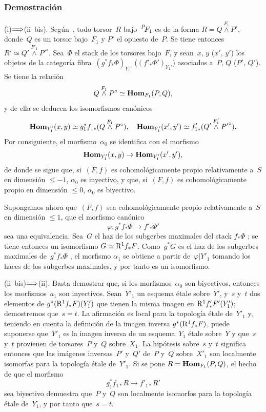 \subsubsection*{Demostración}
(i)$\Longrightarrow$(ii~bis). Según~\cite[II 4.2.5]{XIII.1}, todo torsor~$R$
bajo~$\leftexp{P\mkern-4mu}{F}_1$ es de la forma $R = Q
\overset{F_1}{\wedge} P^\circ$, donde~$Q$ es un torsor bajo~$F_1$ y
$P^\circ$ el opuesto de~$P$. Se tiene entonces $R' \simeq Q'
\overset{F'_1}{\wedge} {P'}^\circ$. Sea~$\Phi$ el stack de los torsores
bajo~$F$, y sean~$x$, $y$ (\resp $x'$, $y'$) los objetos de la categoría
fibra~$(g^* f_* \Phi)_{Y_1'}$ (\resp $(f'_*
\Phi')_{Y_1'}$) asociados a~$P$, $Q$ (\resp $P'$, $Q'$). Se tiene la
relación
$$
Q\overset{F_1}{\wedge} P^\circ \simeq \operatorname{\mathbf{Hom}}_{F_1}(P,Q) \text{,}
$$
y de ella se deducen los isomorfismos canónicos
$$
\operatorname{\mathbf{Hom}}_{Y'_1}(x,y) \simeq g_1^* f_{1 *}(Q
\overset{F_1}{\wedge} P^\circ) \text{,}\quad \operatorname{\mathbf{Hom}}_{Y_1'}(x',y')
\simeq f'_{1 *}(Q' \overset{F'_1}{\wedge}{P'}^\circ)\text{.}
$$
Por consiguiente, el morfismo~$\alpha_0$ se identifica con el morfismo
$$
\operatorname{\mathbf{Hom}}_{Y'_1}(x,y) \to \operatorname{\mathbf{Hom}}_{Y'_1}(x',y') \text{,}
$$
de donde se sigue que, si~$(F,f)$ es cohomológicamente propio
relativamente a~$S$ en dimensión $\leqslant -1$, $\alpha_0$ es inyectivo,
y que, si~$(F,f)$ es cohomológicamente propio en dimensión $\leqslant 0$,
$\alpha_0$ es biyectivo.

Supongamos ahora que~$(F,f)$ sea cohomológicamente propio relativamente
a~$S$ en dimensión $\leqslant 1$, \ie que el morfismo canónico
$$
\varphi \colon g^* f_* \Phi \to f'_* \Phi'
$$
sea una equivalencia. Sea~$G$ el haz de los subgerbes maximales del stack
$f_* \Phi$ \hbox{\cite[III~2.1.8]{XIII.1}}; se tiene entonces un
isomorfismo $G \simeq \mathrm{R}^1 f_* F$. Como~$g^* G$ es el haz de los subgerbes
maximales de~$g^* f_* \Phi$ \cite[III 2.1.5.5]{XIII.2}, el morfismo
$\alpha_1$ se obtiene a partir de~$\varphi|Y'_1$ tomando los haces de los
subgerbes maximales, y por tanto es un isomorfismo.

(ii~bis)$\Longrightarrow$(ii). Basta demostrar que, si los morfismos~$\alpha_0$ son
biyectivos, entonces los morfismos~$a_1$ son inyectivos. Sean~$Y'_1$ un
esquema étale sobre~$Y'$, y~$s$ y~$t$ dos elementos de
$g^*(\mathrm{R}^1 f_* F)(Y'_1)$ que tienen la misma imagen en
$\mathrm{R}^1 f'_* F'(Y'_1)$; demostremos que~$s=t$. La afirmación es local para
la topología étale de~$Y'_1$ y, teniendo en cuenta la definición de la
imagen inversa $g^*(\mathrm{R}^1 f_* F)$, puede suponerse que~$Y'_1$ es la imagen
inversa de un esquema~$Y_1$ étale sobre~$Y$ y que~$s$ y~$t$ provienen de
torsores~$P$ y~$Q$ sobre~$X_1$. La hipótesis sobre~$s$ y~$t$ significa
entonces que las imágenes inversas~$P'$ y~$Q'$ de~$P$ y~$Q$ sobre~$X'_1$
son localmente isomorfas para la topología étale de~$Y'_1$. Si se pone
$R = \operatorname{\mathbf{Hom}}_{F_1}(P,Q)$, el hecho de que el morfismo
$$
g_1^* f_{1 *} R \to f'_{1 *} R'
$$
sea biyectivo demuestra que~$P$ y~$Q$ son localmente isomorfos para la
topología étale de~$Y_1$, y por tanto que~$s=t$.

